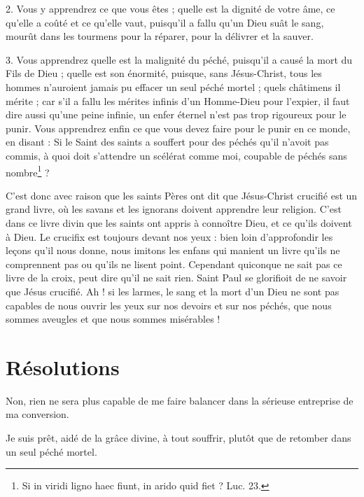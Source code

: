 \documentclass[instructions.tex]{subfiles}
\begin{document}
2. Vous y apprendrez ce que vous êtes ; quelle est la dignité de votre âme, ce qu’elle a coûté et ce qu’elle vaut, puisqu’il a fallu qu’un Dieu suât le sang, mourût dans les tourmens pour la réparer, pour la délivrer et la sauver.

3. Vous apprendrez quelle est la malignité du péché, puisqu’il a causé la mort du Fils de Dieu ; quelle est son énormité, puisque, sans Jésus-Christ, tous les hommes n’auroient jamais pu effacer un seul péché mortel ; quels châtimens il mérite ; car s’il a fallu les mérites infinis d’un Homme-Dieu pour l’expier, il faut dire aussi qu’une peine infinie, un enfer éternel n’est pas trop rigoureux pour le punir. Vous apprendrez enfin ce que vous devez faire pour le punir en ce monde, en disant : Si le Saint des saints a souffert pour des péchés qu’il n’avoit pas commis, à quoi doit s’attendre un scélérat comme moi, coupable de péchés sans nombre\footnote{Si in viridi ligno haec fiunt, in arido quid fiet ? Luc. 23.} ?

C’est donc avec raison que les saints Pères ont dit que Jésus-Christ crucifié est un grand livre, où les savans et les ignorans doivent apprendre leur religion. C’est dans ce livre divin que les saints ont appris à connoître Dieu, et ce qu’ils doivent à Dieu. Le crucifix est toujours devant nos yeux : bien loin d’approfondir les leçons qu’il nous donne, nous imitons les enfans qui manient un livre qu’ils ne comprennent pas ou qu’ils ne lisent point. Cependant quiconque ne sait pas ce livre de la croix, peut dire qu’il ne sait rien. Saint Paul se glorifioit de ne savoir que Jésus crucifié. Ah ! si les larmes, le sang et la mort d’un Dieu ne sont pas capables de nous ouvrir les yeux sur nos devoirs et sur nos péchés, que nous sommes aveugles et que nous sommes misérables !

\section{Résolutions}

\primo Non, rien ne sera plus capable de me faire balancer dans la sérieuse entreprise de ma conversion.  

\secundo Je suis prêt, aidé de la grâce divine, à tout souffrir, plutôt que de retomber dans un seul péché mortel. 

\end{document}
